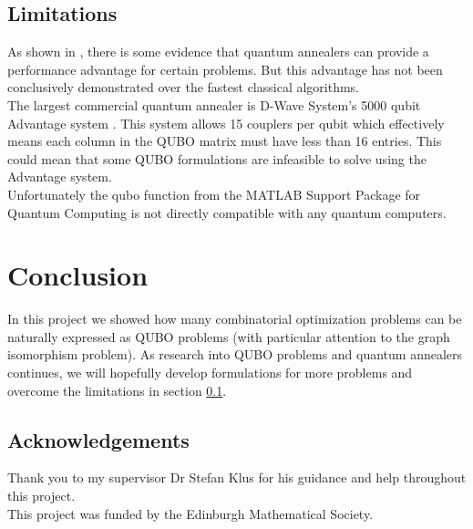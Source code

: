\documentclass{article}
\begin{document}
\subsection{Limitations}
\label{sec:limitations}

As shown in \cite{tasseff2022emergingpotentialquantumannealing}, there is some evidence that quantum annealers can provide a performance advantage for certain problems. But this advantage has not been conclusively demonstrated over the fastest classical algorithms.\\

\noindent The largest commercial quantum annealer is D-Wave System's 5000 qubit Advantage system \cite{DWaveSystemsAdvantage}. This system allows 15 couplers per qubit which effectively means each column in the QUBO matrix must have less than 16 entries. This could mean that some QUBO formulations are infeasible to solve using the Advantage system.\\

\noindent Unfortunately the qubo function from the MATLAB Support Package for Quantum Computing is not directly compatible with any quantum computers.  
\section{Conclusion}

In this project we showed how many combinatorial optimization problems can be naturally expressed as QUBO problems (with particular attention to the graph isomorphism problem). As research into QUBO problems and quantum annealers continues, we will hopefully develop formulations for more problems and overcome the limitations in section \ref{sec:limitations}.

\subsection{Acknowledgements}

\noindent Thank you to my supervisor Dr Stefan Klus for his guidance and help throughout this project.\\

\noindent This project was funded by the Edinburgh Mathematical Society. 

\newpage

\nocite{*}
\printbibliography %
\end{document}
